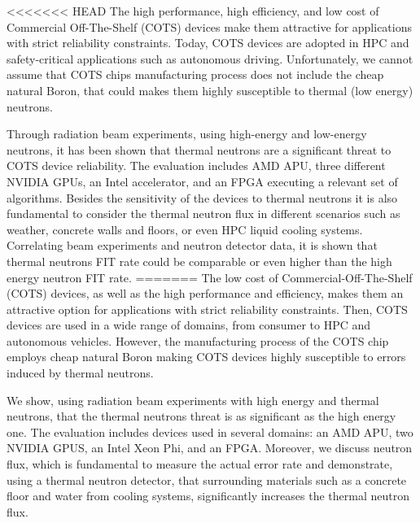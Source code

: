 <<<<<<< HEAD
The high performance, high efficiency, and low cost of Commercial Off-The-Shelf (COTS) devices make them attractive for applications with strict reliability constraints. Today, COTS devices are adopted in HPC and safety-critical applications such as autonomous driving. Unfortunately, we cannot assume that COTS chips manufacturing process does not include the cheap natural Boron, that could makes them highly susceptible to thermal (low energy) neutrons.
 
Through radiation beam experiments, using high-energy and low-energy neutrons, it has been shown that thermal neutrons are a significant threat to COTS device reliability. The evaluation includes AMD APU, three different NVIDIA GPUs, an Intel accelerator, and an FPGA executing a relevant set of algorithms. Besides the sensitivity of the devices to thermal neutrons it is also fundamental to consider the thermal neutron flux in different scenarios such as weather, concrete walls and floors, or even HPC liquid cooling systems. Correlating beam experiments and neutron detector data, it is shown that thermal neutrons 
FIT rate could be comparable or even higher than the high energy neutron FIT rate.
=======
The low cost of Commercial-Off-The-Shelf (COTS) devices, as well as the high performance and efficiency, makes them an attractive option for applications with strict reliability constraints. Then, COTS devices are used in a wide range of domains, from consumer to HPC and autonomous vehicles. However, the manufacturing process of the COTS chip employs cheap natural Boron making COTS devices highly susceptible to errors induced by thermal neutrons.

We show, using radiation beam experiments with high energy and thermal neutrons, that the thermal neutrons threat is as significant as the high energy one. The evaluation includes devices used in several domains: an AMD APU, two NVIDIA GPUS, an Intel Xeon Phi, and an FPGA. Moreover, we discuss neutron flux, which is fundamental to measure the actual error rate and demonstrate, using a thermal neutron detector, that surrounding materials such as a concrete floor and water from cooling systems, significantly increases the thermal neutron flux.

